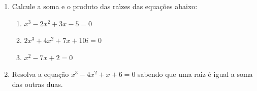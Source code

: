 \documentclass[a4paper,5pt]{amsbook}
\begin{document}
\begin{enumerate}
    \vspace{0.5cm}
    \item Calcule a soma e o produto das ra\'{\i}zes das equa\c{c}\~oes abaixo:
        \begin{enumerate}
            \vspace{0.3cm}
            \item $x^3-2x^2+3x-5=0$
            \vspace{0.3cm}
            \item $2x^3+4x^2+7x+10i=0$
            \vspace{0.3cm}
            \item $x^2-7x+2=0$
        \end{enumerate}

    \vspace{0.5cm}
    \item Resolva a equa\c{c}\~ao $x^3-4x^2+x+6=0$ sabendo que uma raiz \'e igual a
        soma das outras duas.

\end{enumerate}
\end{document}

